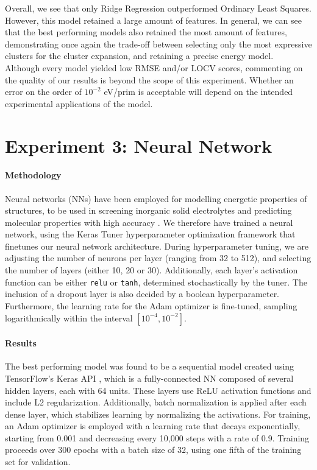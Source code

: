 \documentclass{article}
\let\citep\parencite   %
\begin{document}
Overall, we see that only Ridge Regression outperformed Ordinary Least Squares. However, this model retained a large amount of features. In general, we can see that the best performing models also retained the most amount of features, demonstrating once again the trade-off between selecting only the most expressive clusters for the cluster expansion, and retaining a precise energy model.\\
Although every model yielded low RMSE and/or LOCV scores, commenting on the quality of our results is beyond the scope of this experiment. Whether an error on the order of $10^{-2}$ eV/prim is acceptable will depend on the intended experimental applications of the model.\\

\section{Experiment 3: Neural Network}
\paragraph{Methodology}
Neural networks (NNs) have been employed for modelling energetic properties of structures, to be used in screening inorganic solid electrolytes and predicting molecular properties with high accuracy \citep{NeuralNetworkClusterExpansion}.  
We therefore have trained a neural network, using the Keras Tuner hyperparameter optimization framework \citep{omalley2019kerastuner} that finetunes our neural network architecture. During hyperparameter tuning, we are adjusting the number of neurons per layer (ranging from 32 to 512), and selecting the number of layers (either 10, 20 or 30). Additionally, each layer's activation function can be either \texttt{relu} or \texttt{tanh}, determined stochastically by the tuner.
The inclusion of a dropout layer is also decided by a boolean hyperparameter. Furthermore, the learning rate for the Adam optimizer is fine-tuned, sampling logarithmically within the interval \([10^{-4}, 10^{-2}]\).
\paragraph{Results}
The best performing model was found to be a sequential model created using TensorFlow's Keras API \citep{tensorflow2015-whitepaper}, which is a fully-connected NN composed of several hidden layers, each with 64 units. These layers use ReLU activation functions and include L2 regularization. Additionally, batch normalization is applied after each dense layer, which stabilizes learning by normalizing the activations. For training, an Adam optimizer is employed with a learning rate that decays exponentially, starting from 0.001 and decreasing every 10,000 steps with a rate of 0.9. Training proceeds over 300 epochs with a batch size of 32, using one fifth of the training set for validation. 
\end{document}

